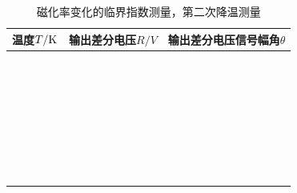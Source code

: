 \documentclass[11pt,a4paper]{ctexart}
\begin{document}
\begin{enumerate}
    \begin{table}[H]
\centering
\caption{磁化率变化的临界指数测量，第二次降温测量\label{tabley3}}
\begin{tabular}{|p{32mm}|p{32mm}|p{32mm}|}
\hline
温度$T/{\rm K}$ & 输出差分电压$R/{V}$ & 输出差分电压信号幅角$\theta$ \\ \hline
 & & \\ \hline
  & & \\ \hline
  & & \\ \hline
   & & \\ \hline
    & & \\ \hline
 & & \\ \hline
  &  &\\ \hline
  &  &\\ \hline
  &  &\\ \hline
  &  &\\ \hline
  &  &\\ \hline
  &  &\\ \hline
  &  &\\ \hline
  &  &\\ \hline
  &  &\\ \hline
  &  &\\ \hline
  &  &\\ \hline
  &  &\\ \hline
    & &\\ \hline
  & &\\ \hline
   & &\\ \hline
     &  &\\ \hline
  &  &\\ \hline
  &  &\\ \hline
  &  &\\ \hline
  &  &\\ \hline
  &  &\\ \hline
  &  &\\ \hline
  &  &\\ \hline
    & &\\ \hline
  & &\\ \hline
   & &\\ \hline
  \end{tabular}
  \end{table}
  

\end{enumerate}
\end{document}
